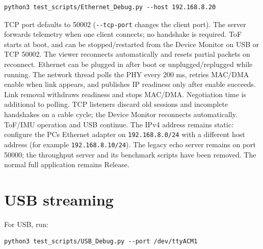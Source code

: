 \documentclass[10pt,a4paper,oneside]{report}
\begin{document}
\begin{verbatim}
python3 test_scripts/Ethernet_Debug.py --host 192.168.8.20
\end{verbatim}

TCP port defaults to 50002 (\texttt{-\allowbreak{}-\allowbreak{}tcp-\allowbreak{}port} changes the client port). The server forwards telemetry when one client connects; no handshake is required. ToF starts at boot, and can be stopped/restarted from the Device Monitor on USB or TCP 50002. The viewer reconnects automatically and resets partial packets on reconnect. Ethernet can be plugged in after boot or unplugged/replugged while running. The network thread polls the PHY every 200 ms, retries MAC/DMA enable when link appears, and publishes IP readiness only after enable succeeds. Link removal withdraws readiness and stops MAC/DMA. Negotiation time is additional to polling. TCP listeners discard old sessions and incomplete handshakes on a cable cycle; the Device Monitor reconnects automatically. ToF/IMU operation and USB continue. The IPv4 address remains static: configure the PC\textquotesingle s Ethernet adapter on \texttt{192.\allowbreak{}168.\allowbreak{}8.\allowbreak{}0/\allowbreak{}24} with a different host address (for example \texttt{192.\allowbreak{}168.\allowbreak{}8.\allowbreak{}10/\allowbreak{}24}). The legacy echo server remains on port 50000; the throughput server and its benchmark scripts have been removed. The normal full application remains Release.

\section{USB streaming}\label{wiki-tools-streaming-and-diagnostics--usb-streaming}

For USB, run:

\begin{verbatim}
python3 test_scripts/USB_Debug.py --port /dev/ttyACM1
\end{verbatim}
\end{document}
